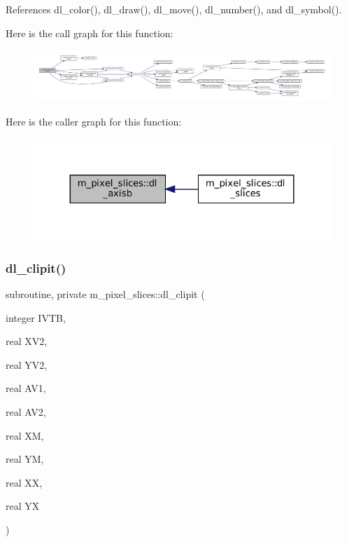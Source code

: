 References dl\+\_\+color(), dl\+\_\+draw(), dl\+\_\+move(), dl\+\_\+number(), and dl\+\_\+symbol().

Here is the call graph for this function\+:\nopagebreak
\begin{figure}[H]
\begin{center}
\leavevmode
\includegraphics[width=350pt]{namespacem__pixel__slices_ab70907b4409a4346c450488b5bcb34a8_cgraph}
\end{center}
\end{figure}
Here is the caller graph for this function\+:\nopagebreak
\begin{figure}[H]
\begin{center}
\leavevmode
\includegraphics[width=324pt]{namespacem__pixel__slices_ab70907b4409a4346c450488b5bcb34a8_icgraph}
\end{center}
\end{figure}
\mbox{\label{namespacem__pixel__slices_af0a3aeaa17e192568cb6a69a3b3eeab6}} 
\subsubsection{\texorpdfstring{dl\+\_\+clipit()}{dl\_clipit()}}
{\footnotesize\ttfamily subroutine, private m\+\_\+pixel\+\_\+slices\+::dl\+\_\+clipit (\begin{DoxyParamCaption}\item[{integer}]{I\+V\+TB,  }\item[{real}]{X\+V2,  }\item[{real}]{Y\+V2,  }\item[{real}]{A\+V1,  }\item[{real}]{A\+V2,  }\item[{real}]{XM,  }\item[{real}]{YM,  }\item[{real}]{XX,  }\item[{real}]{YX }\end{DoxyParamCaption})\hspace{0.3cm}{\ttfamily [private]}}



